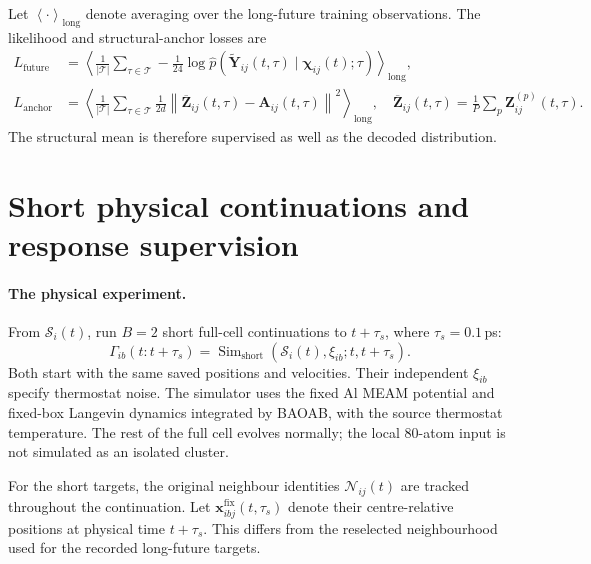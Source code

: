 \documentclass[11pt,a4paper]{article}
\newcommand{\norm}[1]{\left\lVert #1\right\rVert}
\newcommand{\x}{\mathbf x}
\newcommand{\Sim}{\operatorname{Sim}}
\newcommand{\avgl}[1]{\left\langle #1\right\rangle_{\mathrm{long}}}
\begin{document}
Let $\avgl{\cdot}$ denote averaging over the long-future training observations.
The likelihood and structural-anchor losses are
\begin{align}
L_{\mathrm{future}}
&=\avgl{\frac1{|\mathcal T|}\sum_{\tau\in\mathcal T}
-\frac1{24}\log\widehat p\!\left(
\widetilde{\mathbf Y}_{ij}(t,\tau)\mid\boldsymbol\chi_{ij}(t);\tau\right)},
\label{eq:future-loss}\\
L_{\mathrm{anchor}}
&=\avgl{\frac1{|\mathcal T|}\sum_{\tau\in\mathcal T}
\frac1{2d}\norm{\overline{\mathbf Z}_{ij}(t,\tau)-\mathbf A_{ij}(t,\tau)}^2},
\quad
\overline{\mathbf Z}_{ij}(t,\tau)=\frac1P\sum_p\mathbf Z_{ij}^{(p)}(t,\tau).
\label{eq:anchor-loss}
\end{align}
The structural mean is therefore supervised as well as the decoded distribution.

\section{Short physical continuations and response supervision}

\paragraph{The physical experiment.}
From $\mathcal S_i(t)$, run $B=2$ short full-cell continuations to
$t+\tau_s$, where $\tau_s=0.1$\,ps:
\[
\Gamma_{ib}(t:t+\tau_s)
=\Sim_{\mathrm{short}}\!\left(\mathcal S_i(t),\xi_{ib};t,t+\tau_s\right).
\]
Both start with the same saved positions and velocities. Their independent
$\xi_{ib}$ specify thermostat noise. The simulator uses the fixed Al MEAM
potential and fixed-box Langevin dynamics integrated by BAOAB, with the source
thermostat temperature. The rest of the full cell evolves normally; the local
80-atom input is not simulated as an isolated cluster.

For the short targets, the original neighbour identities $\mathcal N_{ij}(t)$
are tracked throughout the continuation. Let
$\x_{ibj}^{\mathrm{fix}}(t,\tau_s)$ denote their centre-relative positions at
physical time $t+\tau_s$. This differs from the reselected neighbourhood used
for the recorded long-future targets.
\end{document}
